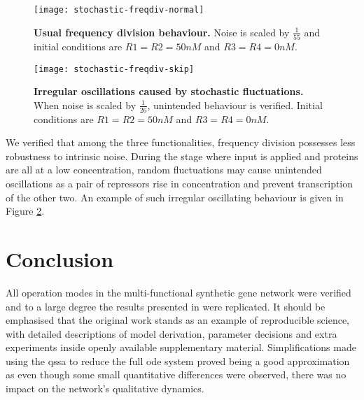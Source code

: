     \begin{figure}[!ht]
      \centering
      \texttt{[image: stochastic-freqdiv-normal]}
      \caption{\textbf{Usual frequency division behaviour.} Noise is scaled by $\frac{1}{55}$ and initial conditions are $R1 = R2 = 50nM$ and $R3 = R4 = 0nM$.}
      \label{fig.stochastic-freqdiv-normal}
    \end{figure}
    \begin{figure}[!hb]
      \centering
      \texttt{[image: stochastic-freqdiv-skip]}
      \caption{\textbf{Irregular oscillations caused by stochastic fluctuations.} When noise is scaled by $\frac{1}{26}$, unintended behaviour is verified. Initial conditions are $R1 = R2 = 50nM$ and $R3 = R4 = 0nM$.}
      \label{fig.stochastic-freqdiv-skip}
    \end{figure}

    We verified that among the three functionalities, frequency division possesses less robustness to intrinsic noise.
    During the stage where input is applied and proteins are all at a low concentration, random fluctuations may cause unintended oscillations as a pair of repressors rise in concentration and prevent transcription of the other two.
    An example of such irregular oscillating behaviour is given in Figure \ref{fig.stochastic-freqdiv-skip}.





\section{Conclusion}

  All operation modes in the multi-functional synthetic gene network were verified and to a large degree the results presented in \cite{originals} were replicated.
  It should be emphasised that the original work stands as an example of reproducible science, with detailed descriptions of model derivation, parameter decisions and extra experiments inside openly available supplementary material.
  Simplifications made using the \ac{qssa} to reduce the full \ac{ode} system proved being a good approximation as even though some small quantitative differences were observed, there was no impact on the network's qualitative dynamics.

